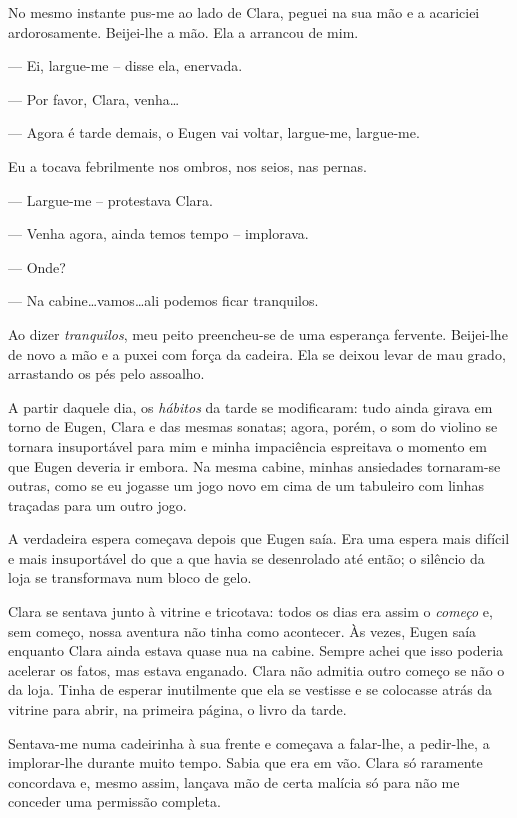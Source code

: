 No mesmo instante pus-me ao lado de Clara, peguei na sua mão e a acariciei ardorosamente. Beijei-lhe a mão. Ela a arrancou de mim.

--- Ei, largue-me -- disse ela, enervada.

--- Por favor, Clara, venha\dots

--- Agora é tarde demais, o Eugen vai voltar, largue-me, largue-me.

Eu a tocava febrilmente nos ombros, nos seios, nas pernas.

--- Largue-me -- protestava Clara.

--- Venha agora, ainda temos tempo -- implorava.

--- Onde?

--- Na cabine\dots vamos\dots ali podemos ficar tranquilos.

Ao dizer \textit{tranquilos}, meu peito preencheu-se de uma esperança fervente. Beijei-lhe de novo a mão e a puxei com força da cadeira. Ela se deixou levar de mau grado, arrastando os pés pelo assoalho.

A partir daquele dia, os \textit{hábitos} da tarde se modificaram: tudo ainda girava em torno de Eugen, Clara e das mesmas sonatas; agora, porém, o som do violino se tornara insuportável para mim e minha impaciência espreitava o momento em que Eugen deveria ir embora. Na mesma cabine, minhas ansiedades tornaram-se outras, como se eu jogasse um jogo novo em cima de um tabuleiro com linhas traçadas para um outro jogo. 

A verdadeira espera começava depois que Eugen saía. Era uma espera mais difícil e mais insuportável do que a que havia se desenrolado até então; o silêncio da loja se transformava num bloco de gelo.

Clara se sentava junto à vitrine e tricotava: todos os dias era assim o \textit{começo} e, sem começo, nossa aventura não tinha como acontecer. Às vezes, Eugen saía enquanto Clara ainda estava quase nua na cabine. Sempre achei que isso poderia acelerar os fatos, mas estava enganado. Clara não admitia outro começo se não o da loja. Tinha de esperar inutilmente que ela se vestisse e se colocasse atrás da vitrine para abrir, na primeira página, o livro da tarde.

Sentava-me numa cadeirinha à sua frente e começava a falar-lhe, a pedir-lhe, a implorar-lhe durante muito tempo. Sabia que era em vão. Clara só raramente concordava e, mesmo assim, lançava mão de certa malícia só para não me conceder uma permissão completa.

